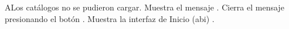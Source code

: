 \begin{UCtrayectoriaA}{A}{Los catálogos no se pudieron cargar.}
    \UCpaso Muestra el mensaje .
    \UCpaso[\UCactor] Cierra el mensaje presionando el botón .
    \UCpaso Muestra la interfaz de Inicio (abi) .
\end{UCtrayectoriaA}
